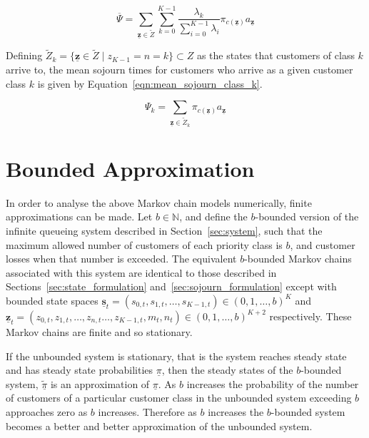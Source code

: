 \documentclass{article}
\begin{document}
\begin{equation}\label{eqn:mean_sojourn}
\overline{\Psi} = \sum_{\underline{\mathbf{z}} \in \tilde{Z}} \sum_{k=0}^{K-1} \frac{\lambda_k}{\sum_{i=0}^{K-1} \lambda_i} \pi_{c(\underline{\mathbf{z}})} a_{\underline{\mathbf{z}}}
\end{equation}

Defining $\tilde{Z}_k = \{\underline{\mathbf{z}} \in \tilde{Z} \; | \; z_{K-1} = n = k\} \subset Z$
as the states that customers of class $k$ arrive to, the mean sojourn times for
customers who arrive as a given customer class $k$ is given by
Equation~\ref{eqn:mean_sojourn_class_k}.

\begin{equation}\label{eqn:mean_sojourn_class_k}
\Psi_k = \sum_{\underline{\mathbf{z}} \in \tilde{Z}_k} \pi_{c(\underline{\mathbf{z}})} a_{\underline{\mathbf{z}}}
\end{equation}



\section{Bounded Approximation}\label{sec:bound}
In order to analyse the above Markov chain models numerically, finite
approximations can be made. Let $b \in \mathbb{N}$, and define the $b$-bounded
version of the infinite queueing system described in Section~\ref{sec:system},
such that the maximum allowed number of customers of each priority class is $b$,
and customer losses when that number is exceeded. The equivalent $b$-bounded
Markov chains associated with this system are identical to those described in
Sections~\ref{sec:state_formulation} and~\ref{sec:sojourn_formulation} except
with bounded state spaces
$\underline{\mathbf{s}}_t = (s_{0,t}, s_{1,t}, \dots, s_{K-1,t}) \in (0, 1, \dots, b)^K$ and
$\underline{\mathbf{z}}_t = (z_{0,t}, z_{1,t}, \dots, z_{n,t} \dots, z_{K-1,t}, m_t, n_t) \in (0, 1, \dots, b)^{K+2}$
respectively. These Markov chains are finite and so stationary.

If the unbounded system is stationary, that is the system reaches steady state
and has steady state probabilities $\underline{\pi}$, then the steady states of
the $b$-bounded system, $\underline{\tilde{\pi}}$ is an approximation of
$\underline{\pi}$. As $b$ increases the probability of the number of
customers of a particular customer class in the unbounded system exceeding $b$
approaches zero as $b$ increases. Therefore as $b$ increases the $b$-bounded
system becomes a better and better approximation of the unbounded system.
\end{document}
